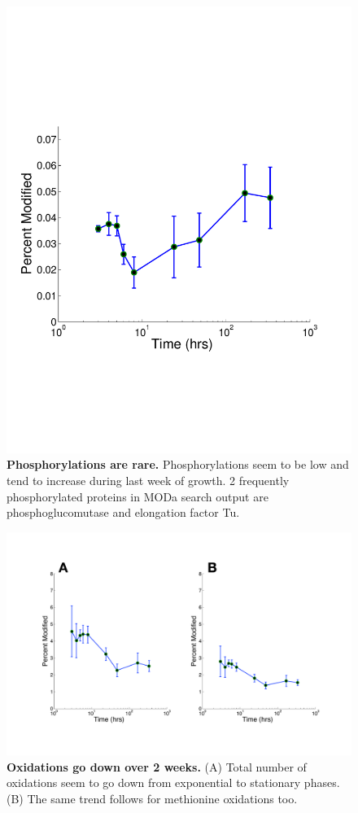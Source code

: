 \documentclass[12pt]{article}
\begin{document}
\clearpage
\begin{figure}[p]
\centerline{\includegraphics[width=5in]{Figures/Phosphorylations.pdf}}
\caption{\label{fig:Phos}\textbf{Phosphorylations are rare.} Phosphorylations seem to be low and tend to increase during last week of growth. 2 frequently phosphorylated proteins in MODa search output are phosphoglucomutase and elongation factor Tu.}
\end{figure}


\clearpage
\begin{figure}[p]
\centerline{\includegraphics[width=8in]{Figures/Oxidations.pdf}}
\caption{\label{fig:Oxid}\textbf{Oxidations go down over 2 weeks.} (A) Total number of oxidations seem to go down from exponential to stationary phases. (B) The same trend follows for methionine oxidations too.}
\end{figure}
\end{document}
